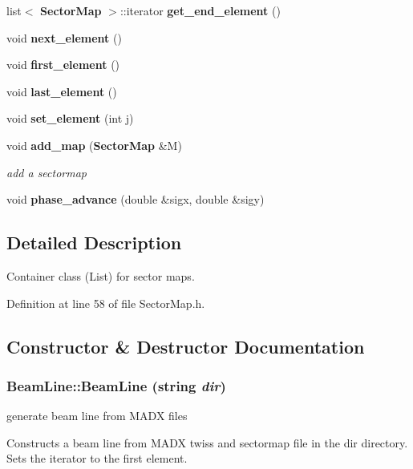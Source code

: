\begin{CompactItemize}
\item 
list$<$ {\bf Sector\-Map} $>$::iterator {\bf get\_\-end\_\-element} ()\label{classBeamLine_a12}

\item 
void {\bf next\_\-element} ()\label{classBeamLine_a13}

\item 
void {\bf first\_\-element} ()\label{classBeamLine_a14}

\item 
void {\bf last\_\-element} ()\label{classBeamLine_a15}

\item 
void {\bf set\_\-element} (int j)\label{classBeamLine_a16}

\item 
void {\bf add\_\-map} ({\bf Sector\-Map} \&M)\label{classBeamLine_a17}

\begin{CompactList}\small\item\em add a sectormap\item\end{CompactList}\item 
void {\bf phase\_\-advance} (double \&sigx, double \&sigy)
\end{CompactItemize}


\subsection{Detailed Description}
Container class (List) for sector maps.



Definition at line 58 of file Sector\-Map.h.

\subsection{Constructor \& Destructor Documentation}
\subsubsection{\setlength{\rightskip}{0pt plus 5cm}Beam\-Line::Beam\-Line (string {\em dir})}\label{classBeamLine_a1}


generate beam line from MADX files

Constructs a beam line from MADX twiss and sectormap file in the dir directory. Sets the iterator to the first element. 

